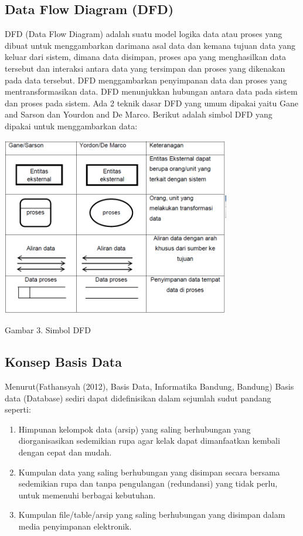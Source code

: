 \documentclass{jtetiproposalskripsi}
\begin{document}
\subsection{Data Flow Diagram (DFD)}
DFD (Data Flow Diagram) adalah suatu model logika data atau proses yang dibuat untuk menggambarkan darimana asal data dan kemana tujuan data yang keluar dari sistem, dimana data disimpan, proses apa yang menghasilkan data tersebut dan interaksi antara data yang tersimpan dan proses yang dikenakan pada data tersebut. DFD menggambarkan penyimpanan data dan proses yang mentransformasikan data. DFD menunjukkan hubungan antara data pada sistem dan proses pada sistem. Ada 2 teknik dasar DFD yang umum dipakai yaitu Gane and Sarson dan Yourdon and De Marco. Berikut adalah simbol DFD yang dipakai untuk menggambarkan data:
\begin{center}
\includegraphics[width=10cm]{gambar/simbolDFD.png} 

Gambar 3. Simbol DFD
\end{center}

\subsection{Konsep Basis Data}
Menurut(Fathansyah (2012), Basis Data, Informatika Bandung, Bandung) Basis data (Database) sediri dapat didefinisikan dalam sejumlah sudut pandang seperti:
\begin{enumerate}
\item Himpunan kelompok data (arsip) yang saling berhubungan yang diorganisasikan sedemikian rupa agar kelak dapat dimanfaatkan kembali dengan cepat dan mudah.
\item Kumpulan data yang saling berhubungan yang disimpan secara bersama sedemikian rupa dan tanpa pengulangan (redundansi) yang tidak perlu, untuk memenuhi berbagai kebutuhan.
\item Kumpulan file/table/arsip yang saling berhubungan yang disimpan dalam media penyimpanan elektronik.
\end{enumerate}
\end{document}
